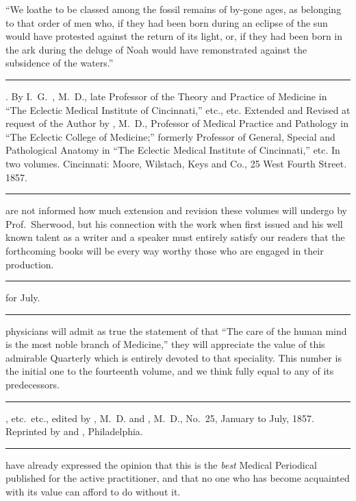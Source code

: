 
``We loathe to be classed among the fossil remains of by-gone ages,
as belonging to that order of men who, if they had been born during
an eclipse of the sun would have protested against the return of its
light, or, if they had been born in the ark during the deluge of Noah
would have remonstrated against the subsidence of the waters.''

\fancybreak{* * *}
\footnotesize
{}. By I.~G.\ , M.~D., late Professor of the
Theory and Practice of Medicine in ``The Eclectic Medical Institute of Cincinnati,''
etc., etc. Extended and Revised at request of the Author by , M.~D.,
Professor of Medical Practice and Pathology in ``The Eclectic College of Medicine;''
formerly Professor of General, Special and Pathological Anatomy in ``The Eclectic
Medical Institute of Cincinnati,'' etc. In two volumes. Cincinnati: Moore, Wilstach,
Keys and Co., 25 West Fourth Street. 1857.
\plainbreak{1}
\normalsize

 are not informed how much extension and revision these volumes
will undergo by Prof.\ Sherwood, but his connection with the work when
first issued and his well known talent as a writer and a speaker must
entirely satisfy our readers that the forthcoming books will be every
way worthy those who are engaged in their production.

\fancybreak{* * *}
\footnotesize
{} for July.
\plainbreak{1}
\normalsize

 physicians will admit as true the statement of  that ``The
care of the human mind is the most noble branch of Medicine,'' they
will appreciate the value of this admirable Quarterly which is entirely
devoted to that speciality. This number is the initial one to the fourteenth
volume, and we think fully equal to any of its predecessors.

\fancybreak{* * *}
\footnotesize
{}, etc.\ etc., edited by , M.~D.
and , M.~D., No.\ 25, January to July, 1857. Reprinted by  and
, Philadelphia.
\plainbreak{1}
\normalsize

 have already expressed the opinion that this is the \emph{best} Medical
Periodical published for the active practitioner, and that no one who
has become acquainted with its value can afford to do without it.

